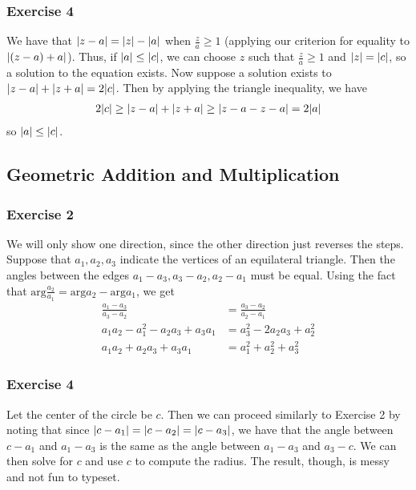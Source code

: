 \subsubsection{Exercise 4}
We have that $\abs{z - a} = \abs{z} - \abs{a}$ when $\frac{z}{a} \geq 1$ (applying our criterion for equality
to $\abs{(z - a) + a}$). Thus, if $\abs{a} \leq \abs{c}$, we can choose $z$ such that $\frac{z}{a} \geq 1$ 
and $\abs{z} = \abs{c}$, so a solution to the equation exists. Now suppose a solution exists to 
 $\abs{z - a} + \abs{z + a} = 2\abs{c}$. Then by applying the triangle inequality, we have 
 \begin{align*}
         2\abs{c} \geq \abs{z - a} + \abs{z + a} \geq \abs{z - a - z - a} = 2\abs{a}
 \end{align*}
 so $\abs{a} \leq \abs{c}$.

\subsection{Geometric Addition and Multiplication}

\subsubsection{Exercise 2}
We will only show one direction, since the other direction just reverses the steps. Suppose that 
$a_1, a_2, a_3$ indicate the vertices of an equilateral triangle. Then the angles between the edges
$a_1 - a_3, a_3 - a_2, a_2 - a_1$ must be equal. Using the fact that $\text{arg} \frac{a_2}{a_1} = \text{arg} a_2 - \text{arg} a_1$, we get
\begin{align*}
        \frac{a_1 - a_3}{a_3 - a_2} &= \frac{a_3 - a_2}{a_2 - a_1} \\
        a_1 a_2 - a_1^2 - a_2 a_3 + a_3 a_1 &= a_3^2 - 2 a_2 a_3 + a_2^2 \\
        a_1 a_2 + a_2 a_3 + a_3 a_1 &= a_1^2 + a_2^2 + a_3^2
\end{align*}

\subsubsection{Exercise 4}
Let the center of the circle be $c$. Then we can proceed similarly to Exercise 2 by noting that since
$\abs{c - a_1} = \abs{c - a_2} = \abs{c - a_3}$, we have that the angle between $c - a_1$ and $a_1 - a_3$ 
is the same as the angle between $a_1 - a_3$ and $a_3 - c$. We can then solve for $c$ and use $c$ to compute
the radius. The result, though, is messy and not fun to typeset.

